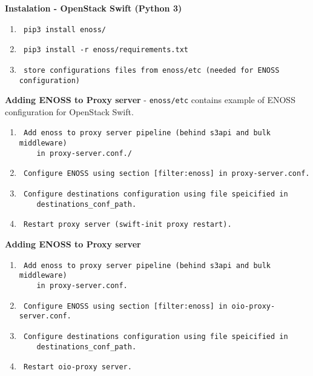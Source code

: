 \textbf{Instalation - OpenStack Swift (Python 3)}
\begin{enumerate}
    \item \begin{verbatim} pip3 install enoss/\end{verbatim}
    \item \begin{verbatim} pip3 install -r enoss/requirements.txt\end{verbatim}
    \item \begin{verbatim} store configurations files from enoss/etc (needed for ENOSS configuration)\end{verbatim}
\end{enumerate}

\textbf{Adding ENOSS to Proxy server} - \texttt{enoss/etc} contains example of ENOSS configuration for OpenStack Swift.
\begin{enumerate}
    \item \begin{verbatim} Add enoss to proxy server pipeline (behind s3api and bulk middleware)
    in proxy-server.conf./\end{verbatim}
    \item \begin{verbatim} Configure ENOSS using section [filter:enoss] in proxy-server.conf.\end{verbatim}
    \item \begin{verbatim} Configure destinations configuration using file speicified in
    destinations_conf_path. \end{verbatim}
    \item \begin{verbatim} Restart proxy server (swift-init proxy restart).\end{verbatim}
\end{enumerate}

\textbf{Adding ENOSS to Proxy server}
\begin{enumerate}
    \item \begin{verbatim} Add enoss to proxy server pipeline (behind s3api and bulk middleware)
    in proxy-server.conf.\end{verbatim}
    \item \begin{verbatim} Configure ENOSS using section [filter:enoss] in oio-proxy-server.conf.\end{verbatim}
    \item \begin{verbatim} Configure destinations configuration using file speicified in
    destinations_conf_path. \end{verbatim}
    \item \begin{verbatim} Restart oio-proxy server.\end{verbatim}
\end{enumerate}

